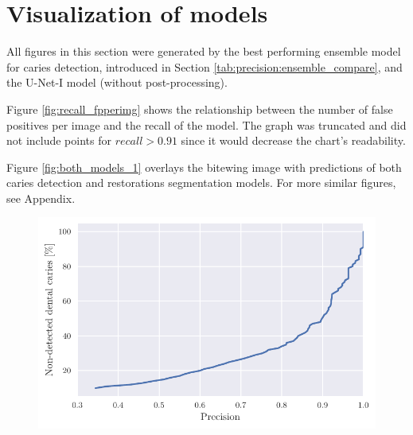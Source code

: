 \section{Visualization of models}
\label{sec:visualization}
All figures in this section were generated by the best performing ensemble model for caries detection, introduced in Section \ref{tab:precision:ensemble_compare}, and the U-Net-I model (without post-processing).

Figure \ref{fig:recall_fpperimg} shows the relationship between the number of false positives per image and the recall of the model. The graph was truncated and did not include points for $recall > 0.91$ since it would decrease the chart's readability.

Figure \ref{fig:both_models_1} overlays the bitewing image with predictions of both caries detection and restorations segmentation models. For more similar figures, see Appendix.



\begin{figure}[h]
    \begin{floatrow}[2]
        { \includegraphics[width=\linewidth]{images/nondet_precision.pdf} }
    \end{floatrow}
\end{figure}

